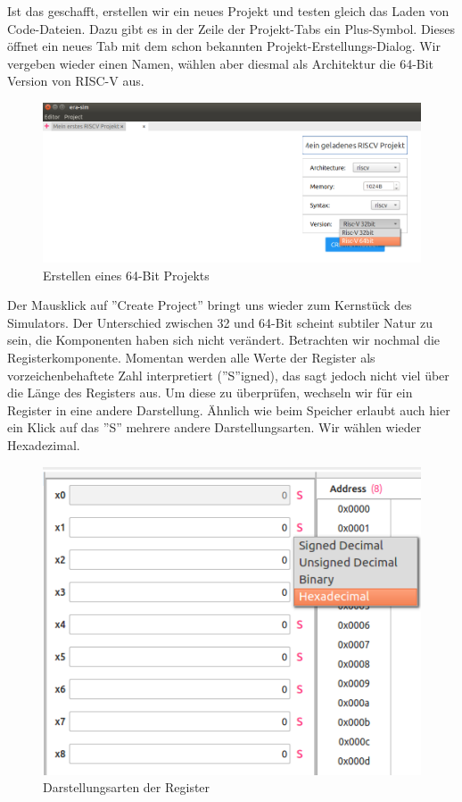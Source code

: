 Ist das geschafft, erstellen wir ein neues Projekt und testen gleich das
Laden von Code-Dateien. Dazu gibt es in der Zeile der Projekt-Tabs ein
Plus-Symbol. Dieses öffnet ein neues Tab mit dem schon bekannten
Projekt-Erstellungs-Dialog. Wir vergeben wieder einen Namen, wählen aber diesmal
als Architektur die 64-Bit Version von RISC-V aus.
\begin{figure}[H]
	\centering
	\includegraphics[scale=0.65]{Images/first-steps-8.png}
	\caption{Erstellen eines 64-Bit Projekts}
\end{figure}

Der Mausklick auf ''Create Project'' bringt uns wieder zum Kernstück des
Simulators. Der Unterschied zwischen 32 und 64-Bit scheint subtiler Natur zu
sein, die Komponenten haben sich nicht verändert.  Betrachten wir nochmal die
Registerkomponente. Momentan werden alle Werte der Register als
vorzeichenbehaftete Zahl interpretiert (''S''igned), das sagt jedoch nicht viel
über die Länge des Registers aus. Um diese zu überprüfen, wechseln wir für ein
Register in eine andere Darstellung. Ähnlich wie beim Speicher erlaubt auch hier
ein Klick auf das ''S'' mehrere andere Darstellungsarten. Wir wählen wieder
Hexadezimal.
\begin{figure}[H]
	\centering
	\includegraphics[scale=1.0]{Images/first-steps-9.png}
	\caption{Darstellungsarten der Register}
\end{figure}

